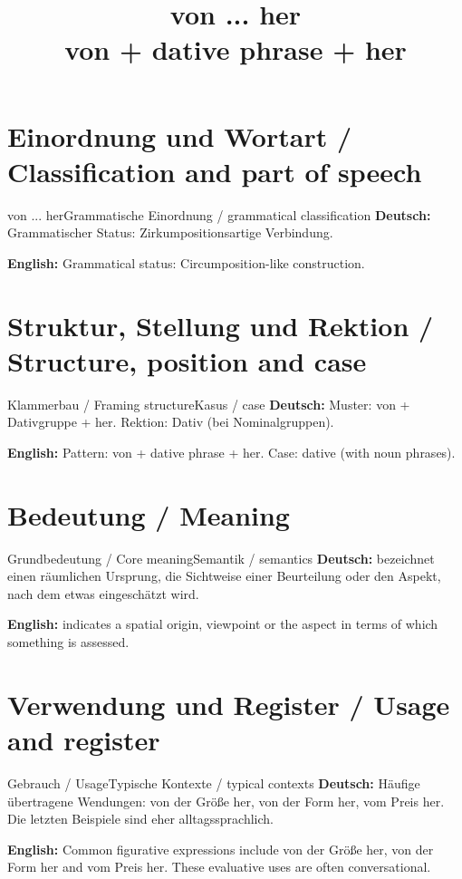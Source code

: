 \documentclass[a4paper,11pt]{article}
\title{von ... her\\ \large von + dative phrase + her}
\date{}
\newcommand{\GermanText}[1]{\textbf{Deutsch: }#1\par}
\newcommand{\EnglishText}[1]{{\small\color{SoftGray}\textbf{English: }#1\par}}
\begin{document}
\maketitle
\tableofcontents
\newpage
\section{Einordnung und Wortart / Classification and part of speech}
\begin{grammarentry}{von ... her}{Grammatische Einordnung / grammatical classification}
\GermanText{Grammatischer Status: Zirkumpositionsartige Verbindung.}
\EnglishText{Grammatical status: Circumposition-like construction.}
\end{grammarentry}
\section{Struktur, Stellung und Rektion / Structure, position and case}
\begin{grammarentry}{Klammerbau / Framing structure}{Kasus / case}
\GermanText{Muster: von + Dativgruppe + her. Rektion: Dativ (bei Nominalgruppen).}
\EnglishText{Pattern: von + dative phrase + her. Case: dative (with noun phrases).}
\end{grammarentry}
\section{Bedeutung / Meaning}
\begin{grammarentry}{Grundbedeutung / Core meaning}{Semantik / semantics}
\GermanText{bezeichnet einen räumlichen Ursprung, die Sichtweise einer Beurteilung oder den Aspekt, nach dem etwas eingeschätzt wird.}
\EnglishText{indicates a spatial origin, viewpoint or the aspect in terms of which something is assessed.}
\end{grammarentry}
\section{Verwendung und Register / Usage and register}
\begin{grammarentry}{Gebrauch / Usage}{Typische Kontexte / typical contexts}
\GermanText{Häufige übertragene Wendungen: von der Größe her, von der Form her, vom Preis her. Die letzten Beispiele sind eher alltagssprachlich.}
\EnglishText{Common figurative expressions include von der Größe her, von der Form her and vom Preis her. These evaluative uses are often conversational.}
\end{grammarentry}
\end{document}
